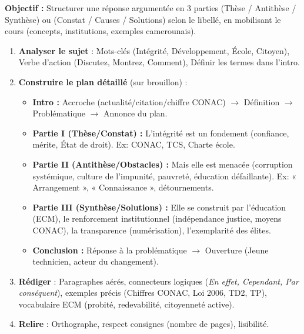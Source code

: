 \documentclass[11pt]{article}
\newcommand{\cle}[1]{{\popxbold\color{popdark}#1}}
\begin{document}
\begin{methode}
    \textbf{Objectif :} Structurer une réponse argumentée en 3 parties (Thèse / Antithèse / Synthèse) ou (Constat / Causes / Solutions) selon le libellé, en mobilisant le cours (concepts, institutions, exemples camerounais).
    \begin{enumerate}
        \item \textbf{Analyser le sujet} : Mots-clés (Intégrité, Développement, École, Citoyen), Verbe d'action (Discutez, Montrez, Comment), Définir les termes dans l'intro.
        \item \textbf{Construire le plan détaillé} (sur brouillon) :
            \begin{itemize}
                \item \textbf{Intro :} Accroche (actualité/citation/chiffre CONAC) $\rightarrow$ Définition $\rightarrow$ Problématique $\rightarrow$ Annonce du plan.
                \item \textbf{Partie I (Thèse/Constat) :} L'intégrité est un \cle{fondement} (confiance, mérite, État de droit). Ex: CONAC, TCS, Charte école.
                \item \textbf{Partie II (Antithèse/Obstacles) :} Mais elle est \cle{menacée} (corruption systémique, culture de l'impunité, pauvreté, éducation défaillante). Ex: « Arrangement », « Connaissance », détournements.
                \item \textbf{Partie III (Synthèse/Solutions) :} Elle se \cle{construit} par l'éducation (ECM), le renforcement institutionnel (indépendance justice, moyens CONAC), la transparence (numérisation), l'exemplarité des élites.
                \item \textbf{Conclusion :} Réponse à la problématique $\rightarrow$ Ouverture (Jeune technicien, acteur du changement).
            \end{itemize}
        \item \textbf{Rédiger} : Paragraphes aérés, connecteurs logiques (\emph{En effet, Cependant, Par conséquent}), exemples précis (Chiffres CONAC, Loi 2006, TD2, TP), vocabulaire ECM (\cle{probité, redevabilité, citoyenneté active}).
        \item \textbf{Relire} : Orthographe, respect consignes (nombre de pages), lisibilité.
    \end{enumerate}
\end{methode}
\end{document}
